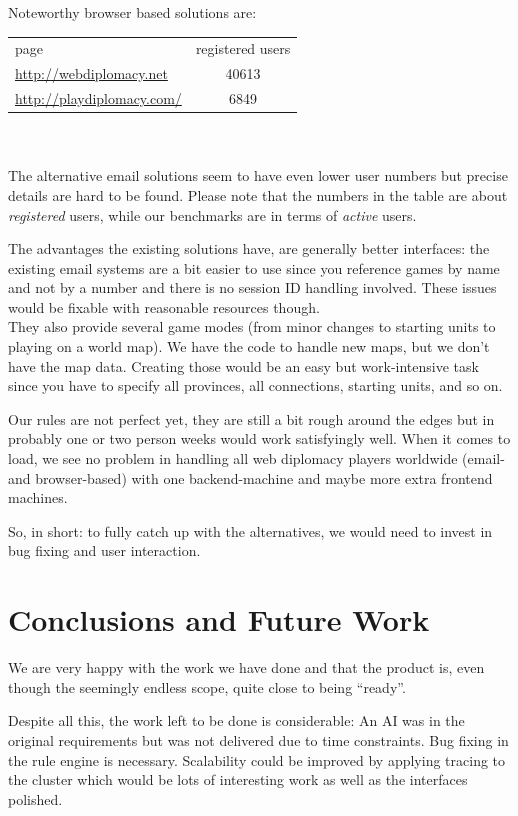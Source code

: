 \documentclass[11pt,a4paper]{report}
\begin{document}
Noteworthy browser based solutions are:\\

\begin{tabular}{lc}
  page                            & registered users \\
  \url{http://webdiplomacy.net}   & 40613 \\
  \url{http://playdiplomacy.com/} & 6849
\end{tabular}
\\
\\The alternative email solutions seem to have even lower user numbers but
precise details are hard to be found. Please note that the numbers in
the table are about {\em registered\/} users, while our benchmarks are in terms
of {\em active\/} users.

The advantages the existing solutions have, are generally better interfaces:
the existing email systems are a bit easier to use since you reference games by
name and not by a number and there is no session ID handling involved.
These issues would be fixable with reasonable resources though. \\
They also provide several game modes (from minor changes to starting units to
playing on a world map). We have the code to handle new maps, but we don't have
the map data. Creating those would be an easy but work-intensive task since
you have to specify all provinces, all connections, starting units, and so on.

Our rules are not perfect yet, they are still a bit rough around the edges but
in probably one or two person weeks would work satisfyingly well.
When it comes to load, we see no problem in handling all web diplomacy
players worldwide (email- and browser-based) with one backend-machine and maybe
more extra frontend machines.

So, in short: to fully catch up with the alternatives, we would need to invest
in bug fixing and user interaction.

\chapter{Conclusions and Future Work}
We are very happy with the work we have done and that the product is, even
though the seemingly endless scope, quite close to being ``ready''.

Despite all this, the work left to be done is considerable:
An AI was in the original requirements but was not delivered due to time
constraints.
Bug fixing in the rule engine is necessary. Scalability could be improved by
applying tracing to the cluster which would be lots of interesting work as well
as the interfaces polished.
\end{document}
